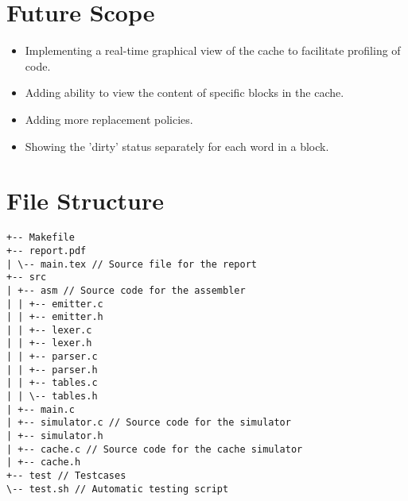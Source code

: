 \documentclass{article}
\begin{document}
\section{Future Scope}
\begin{itemize}
    \item Implementing a real-time graphical view of the cache to facilitate
    profiling of code.
    \item Adding ability to view the content of specific blocks in the cache.
    \item Adding more replacement policies.
    \item Showing the 'dirty' status separately for each word in a block.
\end{itemize}
\section{File Structure}

\begin{verbatim}
+-- Makefile
+-- report.pdf
| \-- main.tex // Source file for the report
+-- src
| +-- asm // Source code for the assembler
| | +-- emitter.c
| | +-- emitter.h
| | +-- lexer.c
| | +-- lexer.h
| | +-- parser.c
| | +-- parser.h
| | +-- tables.c
| | \-- tables.h
| +-- main.c
| +-- simulator.c // Source code for the simulator
| +-- simulator.h
| +-- cache.c // Source code for the cache simulator
| +-- cache.h
+-- test // Testcases
\-- test.sh // Automatic testing script    
\end{verbatim}
\end{document}
